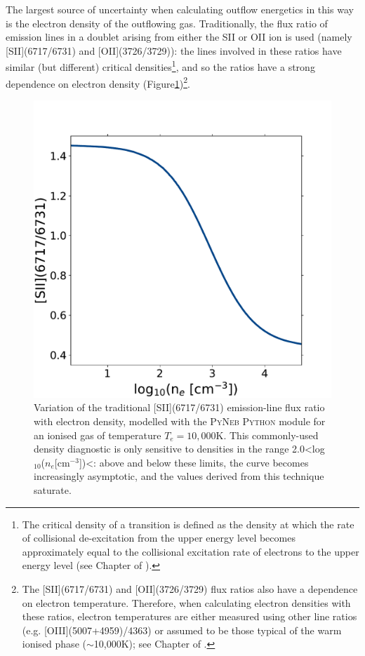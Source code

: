 The largest source of uncertainty when calculating outflow energetics in this way is the electron density of the outflowing gas. Traditionally, the flux ratio of emission lines in a doublet arising from either the SII or OII ion is used (namely [SII](6717/6731) and [OII](3726/3729)): the lines involved in these ratios have similar (but different) critical densities\footnote{The critical density of a transition is defined as the density at which the rate of collisional de-excitation from the upper energy level becomes approximately equal to the collisional excitation rate of electrons to the upper energy level (see Chapter of \citealt{Osterbrock2006}).}, and so the ratios have a strong dependence on electron density (Figure\;\ref{fig: introduction: outflows: energetics: warm_ionised: sii_ratio})\footnote{The [SII](6717/6731) and [OII](3726/3729) flux ratios also have a dependence on electron temperature. Therefore, when calculating electron densities with these ratios, electron temperatures are either measured using other line ratios (e.g. [OIII](5007+4959)/4363) or assumed to be those typical of the warm ionised phase ($\sim$10,000\;K); see Chapter of \citet{Osterbrock2006}.}.

\begin{figure}[!ht]
    \centering
    \includegraphics[width=0.7\linewidth]{figures/introduction/sii_ratio.pdf}
    \caption[{Variation of the [SII](6717/6731) emission-line flux ratio with electron density.}]{Variation of the traditional [SII](6717/6731) emission-line flux ratio with electron density, modelled with the \textsc{PyNeb} \textsc{Python} module \citep{Luridiana2015} for an ionised gas of temperature $T_e=10,000$\;K. This commonly-used density diagnostic is only sensitive to densities in the range 2.0\;\textless\;log$_{10}$($n_e$[cm$^{-3}$])\;\textless{}: above and below these limits, the curve becomes increasingly asymptotic, and the values derived from this technique saturate.}
    \label{fig: introduction: outflows: energetics: warm_ionised: sii_ratio}
\end{figure}

